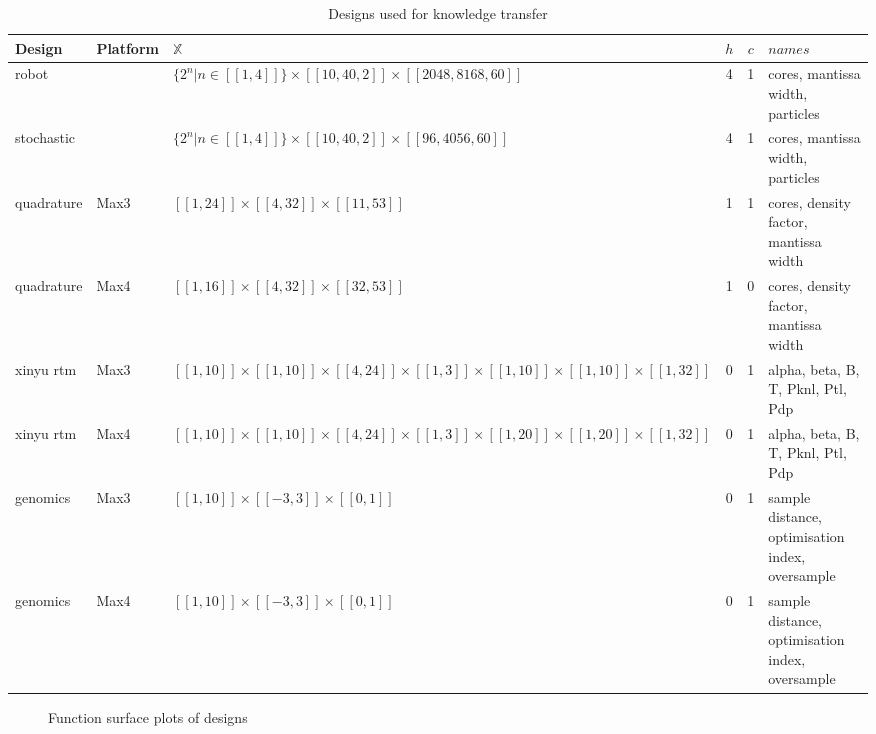 \documentclass[10pt,a4paper]{article}
\newcommand{\dsb}[1]{[\![#1]\!]}
\begin{document}
\begin{table}[H]
	\begin{tabularx}{\linewidth}{X l Y c c X}
		\hline
		Design & Platform & $\mathbb{X}$ & $h$ & $c$ & $names$\\
		\hline
		robot\cite{Chau2014} & & $\{2^n|n\in\dsb{1,4}\}\times\dsb{10,40,2}\times\dsb{2048,8168,60}$ & 4 & 1 & cores, mantissa width, particles\\
		stochastic\cite{Chau2014} & & $\{2^n|n\in\dsb{1,4}\}\times\dsb{10,40,2}\times\dsb{96,4056,60}$ & 4 & 1 & cores, mantissa width, particles\\
		quadrature\cite{Tse2012} & Max3 & $\dsb{1,24}\times\dsb{4,32}\times\dsb{11,53}$ & 1 & 1 & cores, density factor, mantissa width\\
		quadrature\cite{Tse2012} & Max4 & $\dsb{1,16}\times\dsb{4,32}\times\dsb{32,53}$ & 1 & 0 & cores, density factor, mantissa width\\
		xinyu rtm\cite{Niu2012} & Max3 & $\dsb{1,10}\times\dsb{1,10}\times\dsb{4,24}\times\dsb{1,3}\times\dsb{1,10}\times\dsb{1,10}\times\dsb{1,32}$ & 0 & 1 & alpha, beta, B, T, Pknl, Ptl, Pdp\\
		xinyu rtm\cite{Niu2012} & Max4 & $\dsb{1,10}\times\dsb{1,10}\times\dsb{4,24}\times\dsb{1,3}\times\dsb{1,20}\times\dsb{1,20}\times\dsb{1,32}$ & 0 & 1 & alpha, beta, B, T, Pknl, Ptl, Pdp\\
		genomics\cite{Arram2017} & Max3 & $\dsb{1,10}\times\dsb{-3,3}\times\dsb{0,1}$ & 0 & 1 & sample distance, optimisation index, oversample\\
		genomics\cite{Arram2017} & Max4 & $\dsb{1,10}\times\dsb{-3,3}\times\dsb{0,1}$ & 0 & 1 & sample distance, optimisation index, oversample\\
		\hline
 	\end{tabularx}
	\caption{Designs used for knowledge transfer}
\end{table}

\begin{figure}[H]
	 \begin{center}
	\end{center}
	\caption{Function surface plots of designs}
	\label{fig:subfigures}
\end{figure}
\end{document}
